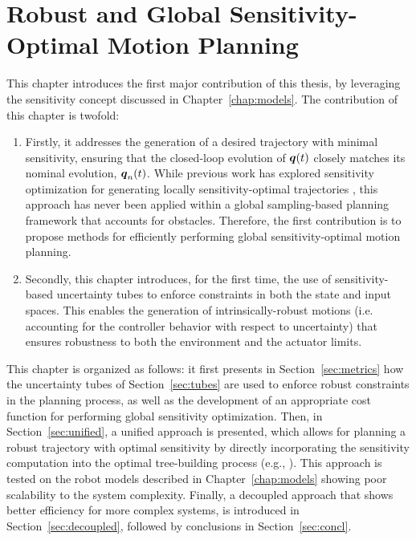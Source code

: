 \chapter{Robust and Global Sensitivity-Optimal Motion Planning}\label{chap:samp}

This chapter introduces the first major contribution of this thesis, by leveraging the sensitivity concept discussed in Chapter~\ref{chap:models}.
The contribution of this chapter is twofold:
\begin{enumerate}
    \item Firstly, it addresses the generation of a desired trajectory with minimal sensitivity, ensuring that the closed-loop evolution of $\boldsymbol{q}(t)$ closely matches its nominal evolution, $\boldsymbol{q}_n(t)$. 
    While previous work has explored sensitivity optimization for generating locally sensitivity-optimal trajectories \cite{cPi, cTh}, this approach has never been applied within a global sampling-based planning framework that accounts for obstacles. 
    Therefore, the first contribution is to propose methods for efficiently performing global sensitivity-optimal motion planning.
    \item Secondly, this chapter introduces, for the first time, the use of sensitivity-based uncertainty tubes to enforce constraints in both the state and input spaces. 
    This enables the generation of intrinsically-robust motions (i.e. accounting for the controller behavior with respect to uncertainty) that ensures robustness to both the environment and the actuator limits.
\end{enumerate}
This chapter is organized as follows: it first presents in Section~\ref{sec:metrics} how the uncertainty tubes of Section~\ref{sec:tubes} are used to enforce robust constraints in the planning process, as well as the development of an appropriate cost function for performing global sensitivity optimization.
Then, in Section~\ref{sec:unified}, a unified approach is presented, which allows for planning a robust trajectory with optimal sensitivity by directly incorporating the sensitivity computation into the optimal tree-building process (e.g., ). 
This approach is tested on the robot models described in Chapter~\ref{chap:models} showing poor scalability to the system complexity.
Finally, a decoupled approach that shows better efficiency for more complex systems, is introduced in Section~\ref{sec:decoupled}, followed by conclusions in Section~\ref{sec:concl}.

